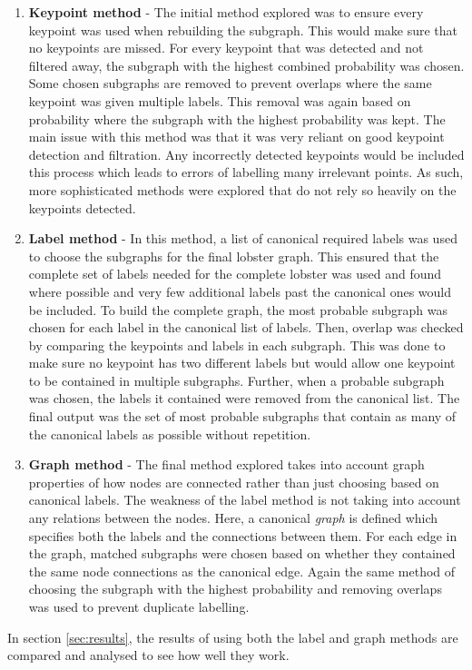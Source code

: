 \begin{enumerate}
\item \textbf{Keypoint method} - The initial method explored was to ensure every keypoint was used when rebuilding the subgraph. This would make sure that no keypoints are missed. For every keypoint that was detected and not filtered away, the subgraph with the highest combined probability was chosen. Some chosen subgraphs are removed to prevent overlaps where the same keypoint was given multiple labels. This removal was again based on probability where the subgraph with the highest probability was kept. The main issue with this method was that it was very reliant on good keypoint detection and filtration. Any incorrectly detected keypoints would be included this process which leads to errors of labelling many irrelevant points. As such, more sophisticated methods were explored that do not rely so heavily on the keypoints detected.
\item \textbf{Label method} - In this method, a list of canonical required labels was used to choose the subgraphs for the final lobster graph. This ensured that the complete set of labels needed for the complete lobster was used and found where possible and very few additional labels past the canonical ones would be included. To build the complete graph, the most probable subgraph was chosen for each label in the canonical list of labels. Then, overlap was checked by comparing the keypoints and labels in each subgraph. This was done to make sure no keypoint has two different labels but would allow one keypoint to be contained in multiple subgraphs. Further, when a probable subgraph was chosen, the labels it contained were removed from the canonical list. The final output was the set of most probable subgraphs that contain as many of the canonical labels as possible without repetition. 
\item \textbf{Graph method} - The final method explored takes into account graph properties of how nodes are connected rather than just choosing based on canonical labels. The weakness of the label method is not taking into account any relations between the nodes. Here, a canonical \textit{graph} is defined which specifies both the labels and the connections between them. For each edge in the graph, matched subgraphs were chosen based on whether they contained the same node connections as the canonical edge. Again the same method of choosing the subgraph with the highest probability and removing overlaps was used to prevent duplicate labelling.
\end{enumerate}
\noindent
In section \ref{sec:results}, the results of using both the label and graph methods are compared and analysed to see how well they work.



